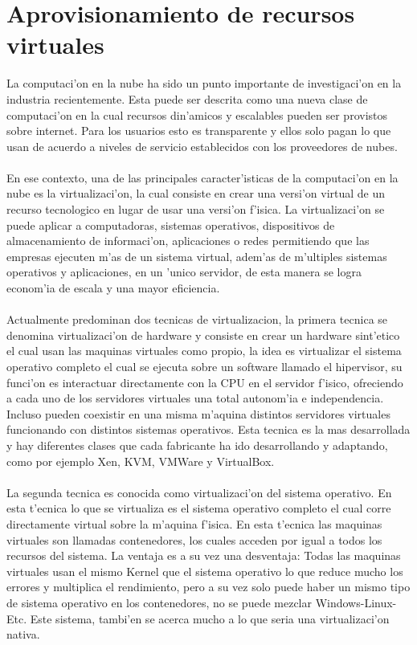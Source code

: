 \chapter{Aprovisionamiento de recursos virtuales}
\label{aprmaqvir}
La computaci'on en la nube ha sido un punto importante de investigaci'on en la industria recientemente. Esta puede ser descrita como una nueva clase de computaci'on en la cual recursos din'amicos y escalables pueden ser provistos sobre internet. Para los usuarios esto es transparente y ellos solo pagan lo que usan de acuerdo a niveles de servicio establecidos con los proveedores de nubes.\\
\\
En ese contexto, una de las principales caracter'isticas de la computaci'on en la nube es la virtualizaci'on, la cual consiste en crear una versi'on virtual de un recurso tecnologico en lugar de usar una versi'on f'isica. La virtualizaci'on se puede aplicar a computadoras, sistemas operativos, dispositivos de almacenamiento de informaci'on, aplicaciones o redes permitiendo que las empresas ejecuten m'as de un sistema virtual, adem'as de m'ultiples sistemas operativos y aplicaciones, en un 'unico servidor, de esta manera se logra econom'ia de escala y una mayor eficiencia.\\
\\
Actualmente predominan dos tecnicas de virtualizacion, la primera tecnica se denomina virtualizaci'on de hardware y consiste en crear un hardware sint'etico el cual usan las maquinas virtuales como propio, la idea es virtualizar el sistema operativo completo el cual se ejecuta sobre un software llamado el hipervisor, su funci'on es interactuar directamente con la CPU en el servidor f'isico, ofreciendo a cada uno de los servidores virtuales una total autonom'ia e independencia. Incluso pueden coexistir en una misma m'aquina distintos servidores virtuales funcionando con distintos sistemas operativos. Esta tecnica es la mas desarrollada y hay diferentes clases que cada fabricante ha ido desarrollando y adaptando, como por ejemplo Xen, KVM, VMWare y VirtualBox.\\
\\
La segunda tecnica es conocida como virtualizaci'on del sistema operativo. En esta t'ecnica lo que se virtualiza es el sistema operativo completo el cual corre directamente virtual sobre la m'aquina f'isica. En esta t'ecnica las maquinas virtuales son llamadas contenedores, los cuales acceden por igual a todos los recursos del sistema. La ventaja es a su vez una desventaja: Todas las maquinas virtuales usan el mismo Kernel que el sistema operativo lo que reduce mucho los errores y multiplica el rendimiento, pero a su vez solo puede haber un mismo tipo de sistema operativo en los contenedores, no se puede mezclar Windows-Linux-Etc. Este sistema, tambi'en se acerca mucho a lo que seria una virtualizaci'on nativa.\\
